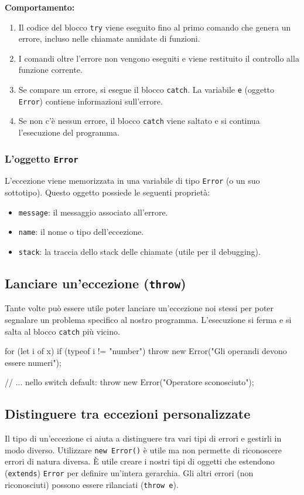 \textbf{Comportamento:}
\begin{enumerate}
    \item Il codice del blocco \texttt{try} viene eseguito fino al primo comando che genera un errore, incluso nelle chiamate annidate di funzioni.
    \item I comandi oltre l'errore non vengono eseguiti e viene restituito il controllo alla funzione corrente.
    \item Se compare un errore, si esegue il blocco \texttt{catch}. La variabile \texttt{e} (oggetto \texttt{Error}) contiene informazioni sull'errore.
    \item Se non c'è nessun errore, il blocco \texttt{catch} viene saltato e si continua l'esecuzione del programma.
\end{enumerate}

\subsubsection{L'oggetto \texttt{Error}}
L'eccezione viene memorizzata in una variabile di tipo \texttt{Error} (o un suo sottotipo). Questo oggetto possiede le seguenti proprietà:
\begin{itemize}
    \item \texttt{message}: il messaggio associato all'errore.
    \item \texttt{name}: il nome o tipo dell'eccezione.
    \item \texttt{stack}: la traccia dello stack delle chiamate (utile per il debugging).
\end{itemize}

\subsection{Lanciare un'eccezione (\texttt{throw})}
Tante volte può essere utile poter lanciare un'eccezione noi stessi per poter segnalare un problema specifico al nostro programma. L'esecuzione si ferma e si salta al blocco \texttt{catch} più vicino.

\begin{jsbox}[title={Utilizzo di throw}]
for (let i of x) {
  if (typeof i != "number")
    throw new Error("Gli operandi devono essere numeri");
}

// ... nello switch
default:
  throw new Error("Operatore sconosciuto");
\end{jsbox}

\subsection{Distinguere tra eccezioni personalizzate}
Il tipo di un'eccezione ci aiuta a distinguere tra vari tipi di errori e gestirli in modo diverso. Utilizzare \texttt{new Error()} è utile ma non permette di riconoscere errori di natura diversa.
È utile creare i nostri tipi di oggetti che estendono (\texttt{extends}) \texttt{Error} per definire un'intera gerarchia. Gli altri errori (non riconosciuti) possono essere rilanciati (\texttt{throw e}).

